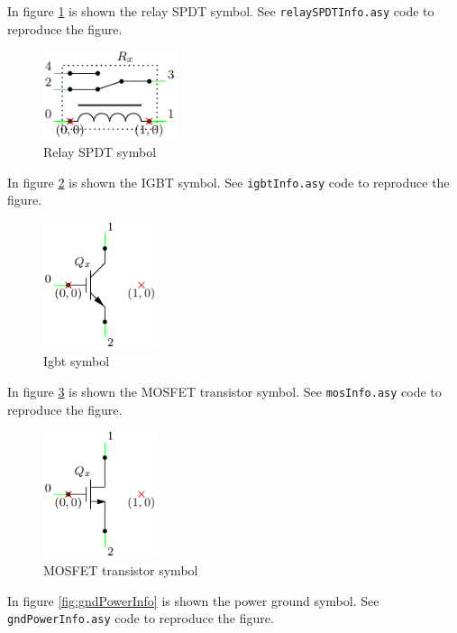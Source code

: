 \documentclass[a4paper,12pt]{report}
\begin{document}
In figure \ref{fig:relaySPDTInfo} is shown the relay SPDT symbol. See \texttt{relaySPDTInfo.asy} code to reproduce the figure.

\begin{figure}[ht]
\centering
\includegraphics[width=0.35\textwidth]{relaySPDTInfo}
\caption{Relay SPDT symbol}
\label{fig:relaySPDTInfo}
\end{figure}

In figure \ref{fig:igbtInfo} is shown the IGBT symbol. See \texttt{igbtInfo.asy} code to reproduce the figure.

\begin{figure}[ht]
\centering
\includegraphics[width=0.3\textwidth]{igbtInfo}
\caption{Igbt symbol}
\label{fig:igbtInfo}
\end{figure}

In figure \ref{fig:mosInfo} is shown the MOSFET transistor symbol. See \texttt{mosInfo.asy} code to reproduce the figure.

\begin{figure}[ht]
\centering
\includegraphics[width=0.3\textwidth]{mosInfo}
\caption{MOSFET transistor symbol}
\label{fig:mosInfo}
\end{figure}

In figure \ref{fig:gndPowerInfo} is shown the power ground symbol. See \texttt{gndPowerInfo.asy} code to reproduce the figure.
\end{document}
